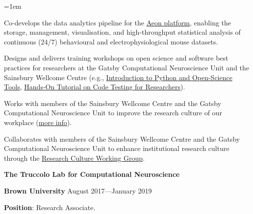 \documentclass{article}
\begin{document}
\begin{list}{}{\leftmargin=1em}
\item Co-develops the data analytics pipeline for the
    \href{https://www.biorxiv.org/content/10.1101/2025.07.31.664513v1}{Aeon
    platform}, enabling the storage, management, visualisation, and
    high-throughput statistical analysis of continuous (24/7) behavioural and
    electrophysiological mouse datasets.

\item Designs and delivers training workshops on open science and software best
    practices for researchers at the Gatsby Computational Neuroscience Unit and
    the Sainsbury Wellcome Centre (e.g.,
    \href{https://sainsburywellcomecentre.github.io/software-skills/events/intro_nov_2019.html}{Introduction
    to Python and Open-Science Tools},
    \href{https://github.com/joacorapela/pyClubCI}{Hands-On Tutorial on Code
    Testing for Researchers}).

\item Works with members of the Sainsbury Wellcome Centre and the Gatsby
    Computational Neuroscience Unit to improve the research culture of our
    workplace (\href{https://sainsburywellcomecentre.github.io/RCWG/}{more info}).

\item Collaborates with members of the Sainsbury Wellcome Centre and the Gatsby
    Computational Neuroscience Unit to enhance institutional research culture
    through the \href{https://sainsburywellcomecentre.github.io/RCWG/}{Research
    Culture Working Group}.

\end{list}

\par
\vspace{2\baselineskip}
{\bf The Truccolo Lab for Computational Neuroscience}
\par
{\bf Brown University} \hspace*{\fill} August 2017---January 2019
\par
{\bf Position}: Research Associate.
\par
\end{document}

